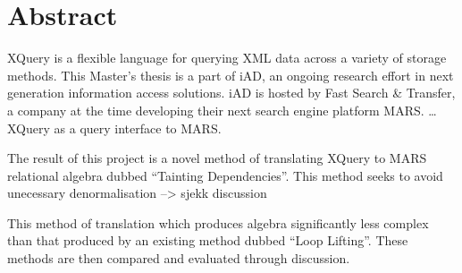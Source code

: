 \chapter*{Abstract}

XQuery is a flexible language for querying XML data across a variety of storage
methods. This Master's thesis is a part of iAD, an ongoing research effort in next generation information access
solutions. iAD is hosted by Fast Search \& Transfer, a company at the time developing their next search engine
platform MARS. \ldots XQuery as a query interface to MARS.

The result of this project is a novel method of translating XQuery to MARS relational algebra dubbed ``Tainting
Dependencies''. This method seeks to avoid unecessary denormalisation --> sjekk discussion

This method of translation which produces algebra significantly less complex than that produced by an existing
method dubbed ``Loop Lifting''. These methods are then compared and evaluated through discussion.
